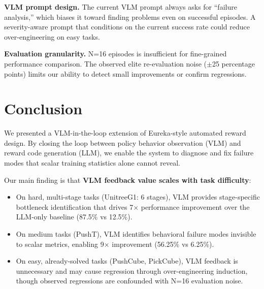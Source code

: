 \documentclass[conference]{IEEEtran}
\begin{document}

\textbf{VLM prompt design.}
The current VLM prompt always asks for ``failure analysis,'' which biases
it toward finding problems even on successful episodes. A severity-aware
prompt that conditions on the current success rate could reduce
over-engineering on easy tasks.

\textbf{Evaluation granularity.}
N=16 episodes is insufficient for fine-grained performance comparison.
The observed elite re-evaluation noise ($\pm$25 percentage points) limits
our ability to detect small improvements or confirm regressions.


\section{Conclusion}

We presented a VLM-in-the-loop extension of Eureka-style automated reward
design. By closing the loop between policy behavior observation (VLM) and reward
code generation (LLM), we enable the system to diagnose and fix failure modes
that scalar training statistics alone cannot reveal.

Our main finding is that \textbf{VLM feedback value scales with task
difficulty}:
\begin{itemize}
  \item On hard, multi-stage tasks (UnitreeG1: 6 stages), VLM provides
    stage-specific bottleneck identification that drives 7$\times$ performance
    improvement over the LLM-only baseline (87.5\% vs 12.5\%).
  \item On medium tasks (PushT), VLM identifies behavioral failure modes
    invisible to scalar metrics, enabling 9$\times$ improvement (56.25\% vs
    6.25\%).
  \item On easy, already-solved tasks (PushCube, PickCube), VLM feedback is
    unnecessary and may cause regression through over-engineering induction,
    though observed regressions are confounded with N=16 evaluation noise.
\end{itemize}
\end{document}
